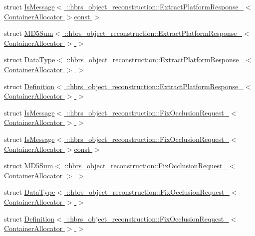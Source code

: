 \begin{DoxyCompactItemize}
struct \hyperlink{structros_1_1message__traits_1_1_is_message_3_01_1_1hbrs__object__reconstruction_1_1_extract_plad57760931949382cb72677cac0c8202f}{\-Is\-Message$<$ \-::hbrs\-\_\-object\-\_\-reconstruction\-::\-Extract\-Platform\-Response\-\_\-$<$ Container\-Allocator $>$const  $>$}
\item 
struct \hyperlink{structros_1_1message__traits_1_1_m_d5_sum_3_01_1_1hbrs__object__reconstruction_1_1_extract_platfe02bd193932d0f6b32732e8a756f98f0}{\-M\-D5\-Sum$<$ \-::hbrs\-\_\-object\-\_\-reconstruction\-::\-Extract\-Platform\-Response\-\_\-$<$ Container\-Allocator $>$ $>$}
\item 
struct \hyperlink{structros_1_1message__traits_1_1_data_type_3_01_1_1hbrs__object__reconstruction_1_1_extract_plata106760921e8766d99f0637aeebd8c04}{\-Data\-Type$<$ \-::hbrs\-\_\-object\-\_\-reconstruction\-::\-Extract\-Platform\-Response\-\_\-$<$ Container\-Allocator $>$ $>$}
\item 
struct \hyperlink{structros_1_1message__traits_1_1_definition_3_01_1_1hbrs__object__reconstruction_1_1_extract_pla358e696e78db188c71360b39ff1af787}{\-Definition$<$ \-::hbrs\-\_\-object\-\_\-reconstruction\-::\-Extract\-Platform\-Response\-\_\-$<$ Container\-Allocator $>$ $>$}
\item 
struct \hyperlink{structros_1_1message__traits_1_1_is_message_3_01_1_1hbrs__object__reconstruction_1_1_fix_occlusi700e86e8af3951a896e3180fa4c51653}{\-Is\-Message$<$ \-::hbrs\-\_\-object\-\_\-reconstruction\-::\-Fix\-Occlusion\-Request\-\_\-$<$ Container\-Allocator $>$ $>$}
\item 
struct \hyperlink{structros_1_1message__traits_1_1_is_message_3_01_1_1hbrs__object__reconstruction_1_1_fix_occlusi7c19e074aeaf7145f0487b61f7941c0d}{\-Is\-Message$<$ \-::hbrs\-\_\-object\-\_\-reconstruction\-::\-Fix\-Occlusion\-Request\-\_\-$<$ Container\-Allocator $>$const  $>$}
\item 
struct \hyperlink{structros_1_1message__traits_1_1_m_d5_sum_3_01_1_1hbrs__object__reconstruction_1_1_fix_occlusionfc5eaa692137555a256b57cb60ad53de}{\-M\-D5\-Sum$<$ \-::hbrs\-\_\-object\-\_\-reconstruction\-::\-Fix\-Occlusion\-Request\-\_\-$<$ Container\-Allocator $>$ $>$}
\item 
struct \hyperlink{structros_1_1message__traits_1_1_data_type_3_01_1_1hbrs__object__reconstruction_1_1_fix_occlusio4406aa34c4519e45ff82ddeab7a3c23e}{\-Data\-Type$<$ \-::hbrs\-\_\-object\-\_\-reconstruction\-::\-Fix\-Occlusion\-Request\-\_\-$<$ Container\-Allocator $>$ $>$}
\item 
struct \hyperlink{structros_1_1message__traits_1_1_definition_3_01_1_1hbrs__object__reconstruction_1_1_fix_occlusi0cd98eedd4d06825f259766097a412ce}{\-Definition$<$ \-::hbrs\-\_\-object\-\_\-reconstruction\-::\-Fix\-Occlusion\-Request\-\_\-$<$ Container\-Allocator $>$ $>$}

\end{DoxyCompactItemize}
